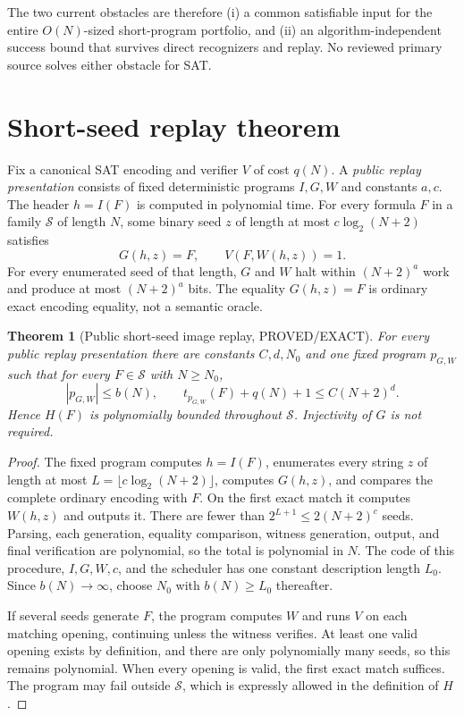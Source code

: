 \documentclass[11pt]{article}
\newtheorem{theorem}{Theorem}
\newcommand{\Hmin}{H}
\begin{document}
The two current obstacles are therefore (i) a common satisfiable input for the
entire $O(N)$-sized short-program portfolio, and (ii) an algorithm-independent
success bound that survives direct recognizers and replay.  No reviewed primary
source solves either obstacle for SAT.

\section{Short-seed replay theorem}
Fix a canonical SAT encoding and verifier $V$ of cost $q(N)$.  A \emph{public
replay presentation} consists of fixed deterministic programs $I,G,W$ and constants
$a,c$.  The header $h=I(F)$ is computed in polynomial time.  For every formula
$F$ in a family $\mathcal S$ of length $N$, some binary seed $z$ of length at most
$c\log_2(N+2)$ satisfies
\[
 G(h,z)=F,\qquad V(F,W(h,z))=1.
\]
For every enumerated seed of that length, $G$ and $W$ halt within $(N+2)^a$ work
and produce at most $(N+2)^a$ bits.  The equality $G(h,z)=F$ is ordinary exact
encoding equality, not a semantic oracle.

\begin{theorem}[Public short-seed image replay, PROVED/EXACT]
For every public replay presentation there are constants $C,d,N_0$ and one fixed
program $p_{G,W}$ such that for every $F\in\mathcal S$ with $N\ge N_0$,
\[
 |p_{G,W}|\le b(N),\qquad
 t_{p_{G,W}}(F)+q(N)+1\le C(N+2)^d.
\]
Hence $\Hmin(F)$ is polynomially bounded throughout $\mathcal S$.
Injectivity of $G$ is not required.
\end{theorem}
\begin{proof}
The fixed program computes $h=I(F)$, enumerates every string $z$ of length at most
$L=\lfloor c\log_2(N+2)\rfloor$, computes $G(h,z)$, and compares the complete
ordinary encoding with $F$.  On the first exact match it computes $W(h,z)$ and
outputs it.  There are fewer than $2^{L+1}\le2(N+2)^c$ seeds.  Parsing, each
generation, equality comparison, witness generation, output, and final verification
are polynomial, so the total is polynomial in $N$.  The code of this procedure,
$I,G,W,c$, and the scheduler has one constant description length $L_0$.  Since
$b(N)\to\infty$, choose $N_0$ with $b(N)\ge L_0$ thereafter.

If several seeds generate $F$, the program computes $W$ and runs $V$ on each
matching opening, continuing unless the witness verifies.  At least one valid
opening exists by definition, and there are only polynomially many seeds, so this
remains polynomial.  When every opening is valid, the first exact match suffices.
The program may fail outside
$\mathcal S$, which is expressly allowed in the definition of $\Hmin$.
\end{proof}
\end{document}

